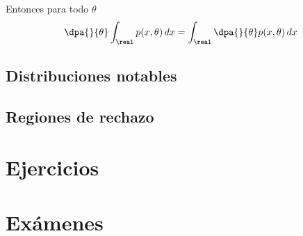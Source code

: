 \documentclass{apuntes}
\begin{document}
Entonces para todo $\theta$
\[ \dpa{}{\theta}\int_\real p(x,\theta)\,dx=\int_\real \dpa{}{\theta} p(x,\theta)\,dx \]

\newpage
\section{Distribuciones notables}
\label{secDistr}


\section{Regiones de rechazo}
\label{secRegRechazo}


\chapter{Ejercicios}


\newpage
\chapter{Exámenes}










\printindex
\end{document}
